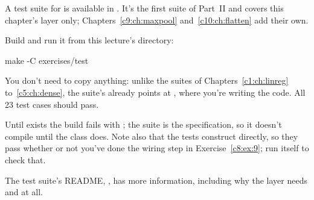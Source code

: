 \label{c8:set:3}

\label{c8:ex:10}
A test suite for  is available in . It's the
first suite of Part~II and covers this chapter's layer only; Chapters~\ref{c9:ch:maxpool}
and~\ref{c10:ch:flatten} add their own.

Build and run it from this lecture's  directory:

\begin{shell}
make -C exercises/test
\end{shell}

\noindent You don't need to copy anything: unlike the suites of Chapters~\ref{c1:ch:linreg}
to~\ref{c5:ch:dense}, the suite's  already points at , where you're
writing the code. All 23 test cases should pass.

Until  exists the build fails with
; the suite is the specification, so
it doesn't compile until the class does. Note also that the tests construct  directly,
so they pass whether or not you've done the  wiring step in
Exercise~\ref{c8:ex:9}; run  itself to check that.

The test suite's README, , has more
information, including why the layer needs  and  at all.
